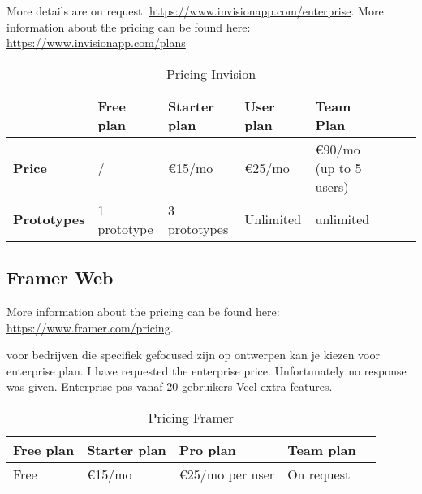 More details are on request. \url{https://www.invisionapp.com/enterprise}. More information about the pricing can be found here: \url{https://www.invisionapp.com/plans}

\begin{table}[H]
\centering
\begin{tabular}{ | l | l | l | l | l | l | l | }
  \toprule
                                & \textbf{Free plan}    & \textbf{Starter plan}     & \textbf{User plan}    & \textbf{Team Plan}        \\
  \midrule
  \textbf{Price}                & /                     & €15/mo                    & €25/mo                & €90/mo (up to 5 users) \\
  \textbf{Prototypes}           & 1 prototype           & 3 prototypes              & Unlimited             & unlimited \\
  \bottomrule
\end{tabular}
\captionsetup{justification=centering}
\caption{Pricing Invision \label{tab:pricing-invision}}
\end{table}

\subsection{Framer Web}
More information about the pricing can be found here: \url{https://www.framer.com/pricing}.

voor bedrijven die specifiek gefocused zijn op ontwerpen kan je kiezen voor enterprise plan.
I have requested the enterprise price. Unfortunately no response was given.
Enterprise pas vanaf 20 gebruikers Veel extra features.

\begin{table}[H]
\centering
\begin{tabular}{ | l | l | l | l | l | }
  \toprule
  \textbf{Free plan}      & \textbf{Starter plan}       & \textbf{Pro plan}    & \textbf{Team plan}    \\
  \midrule
  Free                  & €15/mo                        & €25/mo per user       & On request            \\
  \bottomrule
\end{tabular}
\captionsetup{justification=centering}
\caption{Pricing Framer \label{tab:pricing-framer}}
\end{table}

